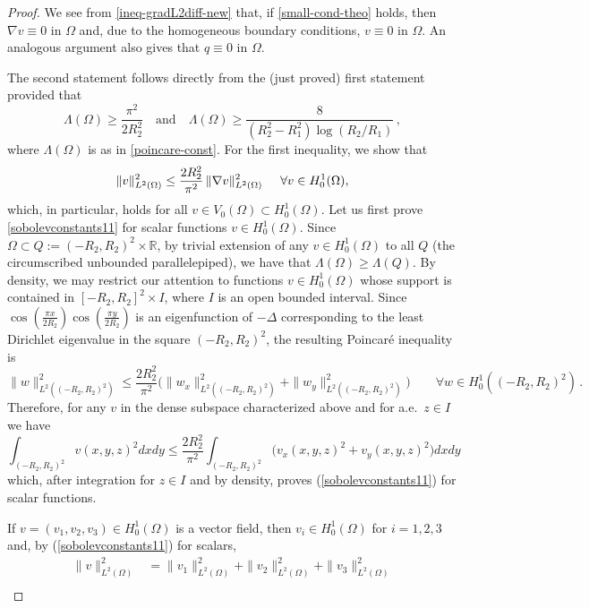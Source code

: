 \documentclass[a4paper,11pt]{amsart}
\numberwithin{equation}{section}
\numberwithin{figure}{section}
\newcommand{\R}{\mathbb{R}}
\def\eq#1{(\ref{#1})}
\begin{document}
\begin{proof}
		We see from \eqref{ineq-gradL2diff-new} that, if
		\eqref{small-cond-theo} holds, then $\nabla v \equiv 0$ in $\Omega$ and, due to the homogeneous boundary conditions, $v\equiv 0$ in $\Omega$. An analogous argument also gives that $ q\equiv0$ in $\Omega$.\par
		The second statement follows directly from the (just proved) first statement provided that
		\begin{equation}\label{boundPoincare}
			\Lambda (\Omega)\ge\frac{\pi^2}{2R_2^2}\quad\mbox{and}\quad\Lambda(\Omega)\ge\frac{8}{(R_2^2 - R_1^2)\log (R_2/R_1)}\, ,
		\end{equation}
		where $\Lambda(\Omega)$ is as in \eqref{poincare-const}. For the first inequality, we show that
		\begin{equation}\label{sobolevconstants11}
			\|v\|_{L^2(\Omega)}^2\leq \frac{2R_2^2}{\pi^2}\, \|\nabla v\|_{L^2(\Omega)}^2\hspace*{5mm}\forall v\in H_0^1(\Omega),
		\end{equation}which, in particular, holds for all $ v\in V_0(\Omega)\subset H^1_0(\Omega)$.
		Let us first prove \eqref{sobolevconstants11} for scalar functions $v\in H_0^1(\Omega)$. Since $\Omega\subset Q:=(-R_2,R_2)^2\times\R$, by
		trivial extension of any $v\in H_0^1(\Omega)$ to all $Q$ (the circumscribed unbounded parallelepiped), we have that
		$\Lambda(\Omega)\ge\Lambda(Q)$. By density, we may restrict our attention to functions $v\in H^1_0(\Omega)$ whose support is contained in
		$[-R_2,R_2]^2\times I$, where $I$ is an open bounded interval. Since $\cos(\tfrac{\pi x}{2R_2})\cos(\tfrac{\pi y}{2R_2})$ is an eigenfunction
		of $-\Delta$ corresponding to the least Dirichlet eigenvalue in the square $(-R_2,R_2)^2$, the resulting Poincaré inequality is
		$$
		\|w\|_{L^2((-R_2,R_2)^2)}^2\le\frac{2R_2^2}{\pi^2}\big(\|w_x\|_{L^2((-R_2,R_2)^2)}^2+\|w_y\|_{L^2((-R_2,R_2)^2)}^2\big)\qquad
		\forall w\in H^1_0((-R_2,R_2)^2)\, .
		$$
		Therefore, for any $v$ in the dense subspace characterized above and for a.e.\ $z\in I$ we have
		$$
		\int_{(-R_2,R_2)^2}v(x,y,z)^2dxdy\le\frac{2R_2^2}{\pi^2}\int_{(-R_2,R_2)^2}\big(v_x(x,y,z)^2+v_y(x,y,z)^2\big)dxdy
		$$
		which, after integration for $z\in I$ and by density, proves \eq{sobolevconstants11} for scalar functions.\par
		If $v=(v_1,v_2,v_3)\in H_0^1(\Omega)$ is a vector field, then $v_i\in H_0^1(\Omega)$ for $i=1,2,3$ and, by \eq{sobolevconstants11} for scalars,
		$$
		\begin{aligned}
			\|v\|^2_{L^2(\Omega)} & = \|v_{1}\|^2_{L^2(\Omega)} + \|v_{2}\|^2_{L^2(\Omega)}+ \|v_3\|^2_{L^2(\Omega)} \\

\end{aligned}$$
\end{proof}
\end{document}

